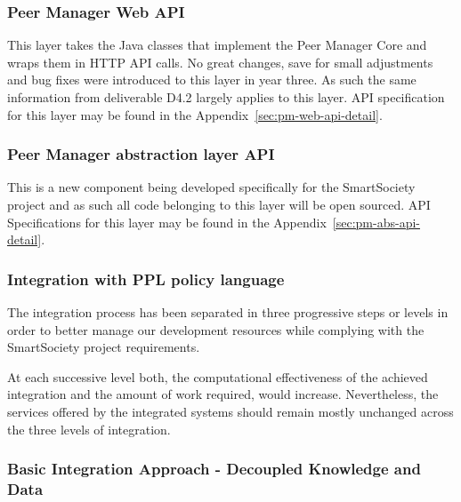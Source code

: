 \subsubsection{Peer Manager Web API} \label{ssec:pm-web-api}
This layer takes the Java classes that implement the Peer Manager Core and wraps them in HTTP API calls. 
No great changes, save for small adjustments and bug fixes were introduced to this layer in year three. As such the same information from deliverable D4.2 largely applies to this layer.
API specification for this layer may be found in the Appendix~\ref{sec:pm-web-api-detail}.


\subsubsection{Peer Manager abstraction layer API} \label{ssec:pm-abs-api}
This is a new component being developed specifically for the SmartSociety project and as such all code belonging to this layer will be open sourced. API Specifications for this layer may be found in the Appendix~\ref{sec:pm-abs-api-detail}.


\subsubsection{Integration with PPL policy language}

The integration process has been separated in three progressive steps or levels in order to better manage our development resources while complying with the SmartSociety project requirements.

At each successive level both, the computational effectiveness of the achieved integration and the amount of work required, would increase. Nevertheless, the services offered by the integrated systems should remain mostly unchanged across the three levels of integration. 


\subsubsection{Basic Integration Approach - Decoupled Knowledge and Data}

